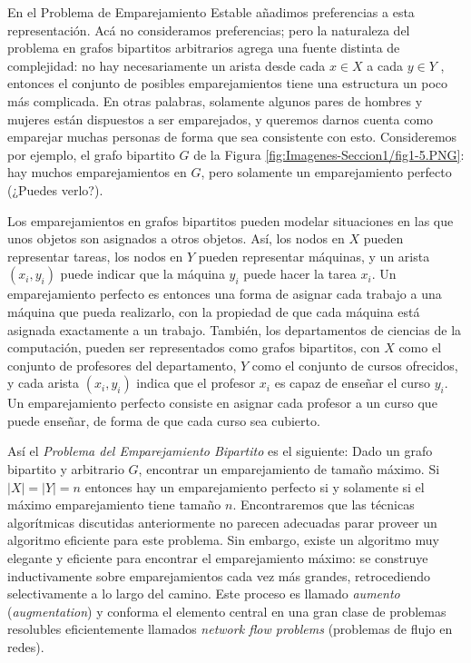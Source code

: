 \documentclass[a4paper, 12pt]{book}
\theoremstyle{dotless}
\begin{document}
En el Problema de Emparejamiento Estable añadimos preferencias a esta representación. Acá no consideramos preferencias; pero la naturaleza del problema en grafos bipartitos arbitrarios agrega una fuente distinta de complejidad: no hay necesariamente un arista desde cada $x \in X$ a cada $y \in Y$ , entonces el conjunto de posibles emparejamientos tiene una estructura un poco más complicada. En otras palabras, solamente algunos pares de hombres y mujeres están dispuestos a ser emparejados, y queremos darnos cuenta como emparejar muchas personas de forma que sea consistente con esto. Consideremos por ejemplo, el grafo bipartito $G$ de la Figura \ref{fig:Imagenes-Seccion1/fig1-5.PNG}: hay muchos emparejamientos en $G$, pero solamente un emparejamiento perfecto (¿Puedes verlo?).

Los emparejamientos en grafos bipartitos pueden modelar situaciones en las que unos objetos son asignados a otros objetos. Así, los nodos en $X$ pueden representar tareas, los nodos en $Y$ pueden representar máquinas, y un arista $(x_i,y_i)$ puede indicar que la máquina $y_i$ puede hacer la tarea $x_i$. Un emparejamiento perfecto es entonces una forma de asignar cada trabajo a una máquina que pueda realizarlo, con la propiedad de que cada máquina está asignada exactamente a un trabajo. También, los departamentos de ciencias de la computación, pueden ser representados como grafos bipartitos, con $X$ como el conjunto de profesores del departamento, $Y$ como el conjunto de cursos ofrecidos, y cada arista $(x_i, y_i)$ indica que el profesor $x_i$ es capaz de enseñar el curso $y_i$. Un emparejamiento perfecto consiste en asignar cada profesor a un curso que puede enseñar, de forma de que cada curso sea cubierto.

Así el \textit{Problema del Emparejamiento Bipartito} es el siguiente: Dado un grafo bipartito y arbitrario $G$, encontrar un emparejamiento de tamaño máximo. Si $|X| = |Y| = n$ entonces hay un emparejamiento perfecto si y solamente si el máximo emparejamiento tiene tamaño $n$. Encontraremos que las técnicas algorítmicas discutidas anteriormente no parecen adecuadas parar proveer un algoritmo eficiente para este problema. Sin embargo, existe un algoritmo muy elegante y eficiente para encontrar el emparejamiento máximo: se construye inductivamente sobre emparejamientos cada vez más grandes, retrocediendo selectivamente a lo largo del camino. Este proceso es llamado \textit{aumento} (\textit{augmentation}) y conforma el elemento central en una gran clase de problemas resolubles eficientemente llamados \textit{network flow problems} (problemas de flujo en redes).
\end{document}
